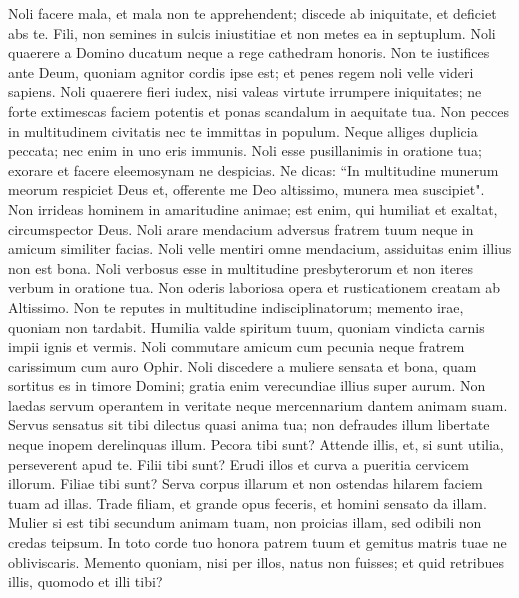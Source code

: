 \begin{biblechapter}  
\verse Noli facere mala, et mala non te apprehendent; 
\verse discede ab iniquitate, et deficiet abs te. 
\verse Fili, non semines in sulcis iniustitiae et non metes ea in septuplum. 
\verse Noli quaerere a Domino ducatum neque a rege cathedram honoris. 
\verse Non te iustifices ante Deum, quoniam agnitor cordis ipse est; et penes regem noli velle videri sapiens. 
\verse Noli quaerere fieri iudex, nisi valeas virtute irrumpere iniquitates; ne forte extimescas faciem potentis et ponas scandalum in aequitate tua. 
\verse Non pecces in multitudinem civitatis nec te immittas in populum. 
\verse Neque alliges duplicia peccata; nec enim in uno eris immunis. 
\verse Noli esse pusillanimis in oratione tua; 
\verse exorare et facere eleemosynam ne despicias. 
\verse Ne dicas: “In multitudine munerum meorum respiciet Deus et, offerente me Deo altissimo, munera mea suscipiet". 
\verse Non irrideas hominem in amaritudine animae; est enim, qui humiliat et exaltat, circumspector Deus. 
\verse Noli arare mendacium adversus fratrem tuum neque in amicum similiter facias. 
\verse Noli velle mentiri omne mendacium, assiduitas enim illius non est bona. 
\verse Noli verbosus esse in multitudine presbyterorum et non iteres verbum in oratione tua. 
\verse Non oderis laboriosa opera et rusticationem creatam ab Altissimo. 
\verse Non te reputes in multitudine indisciplinatorum; 
\verse memento irae, quoniam non tardabit. 
\verse Humilia valde spiritum tuum, quoniam vindicta carnis impii ignis et vermis. 
\verse Noli commutare amicum cum pecunia neque fratrem carissimum cum auro Ophir. 
\verse Noli discedere a muliere sensata et bona, quam sortitus es in timore Domini; gratia enim verecundiae illius super aurum. 
\verse Non laedas servum operantem in veritate neque mercennarium dantem animam suam. 
\verse Servus sensatus sit tibi dilectus quasi anima tua; non defraudes illum libertate neque inopem derelinquas illum. 
\verse Pecora tibi sunt? Attende illis, et, si sunt utilia, perseverent apud te. 
\verse Filii tibi sunt? Erudi illos et curva a pueritia cervicem illorum. 
\verse Filiae tibi sunt? Serva corpus illarum et non ostendas hilarem faciem tuam ad illas. 
\verse Trade filiam, et grande opus feceris, et homini sensato da illam. 
\verse Mulier si est tibi secundum animam tuam, non proicias illam, sed odibili non credas teipsum. In toto corde tuo 
\verse honora patrem tuum et gemitus matris tuae ne obliviscaris. 
\verse Memento quoniam, nisi per illos, natus non fuisses; et quid retribues illis, quomodo et illi tibi? 

\end{biblechapter}
